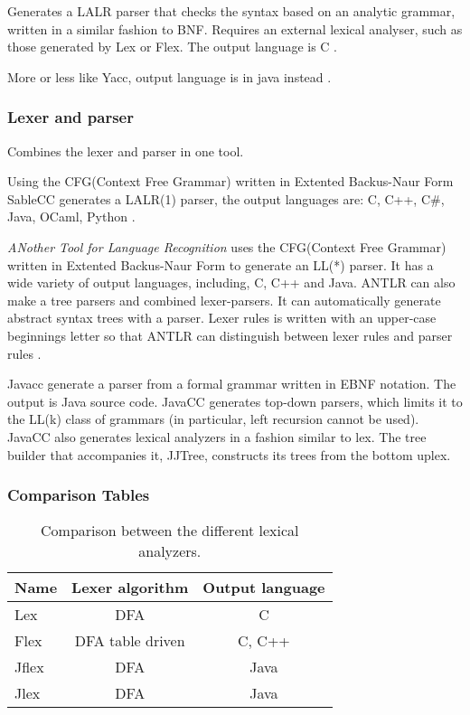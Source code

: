 Generates a LALR parser that checks the syntax based on an analytic grammar, written in a similar fashion to BNF. Requires an external lexical analyser, such as those generated by Lex or Flex. The output language is C \citep{Yacc}.

More or less like Yacc, output language is in java instead \citep{CUP}.

\subsubsection{Lexer and parser}
Combines the lexer and parser in one tool.

Using the CFG(Context Free Grammar) written in Extented Backus-Naur Form SableCC generates a LALR(1) parser, the output languages are: C, C++, C\#, Java, OCaml, Python \citep{SableCC}.

\textit{ANother Tool for Language Recognition} uses the CFG(Context Free Grammar) written in Extented Backus-Naur Form to generate an LL(*) parser. It has a wide variety of output languages, including, C, C++ and Java.
ANTLR can also make a tree parsers and combined lexer-parsers. It can automatically generate abstract syntax trees with a parser\citep{ANTLR}.
Lexer rules is written with an upper-case beginnings letter so that ANTLR can distinguish between lexer rules and parser rules \citep{ANTLRLexer}. 


Javacc generate a parser from a formal grammar written in EBNF notation. The output is Java source code. JavaCC generates top-down parsers, which limits it to the LL(k) class of grammars (in particular, left recursion cannot be used). JavaCC also generates lexical analyzers in a fashion similar to lex\citep{Javacc}. The tree builder that accompanies it, JJTree, constructs its trees from the bottom uplex\citep{JJTree}.

\subsubsection{Comparison Tables}
\begin{table}[H]
\begin{tabular}{|l|c|c|}
\hline
\textbf{Name}	& \textbf{Lexer algorithm}	& \textbf{Output language}	\\ \hline
Lex				& DFA						& C							\\ \hline
Flex			& DFA table driven			& C, C++					\\ \hline
Jflex			& DFA						& Java						\\ \hline
Jlex			& DFA						& Java						\\ \hline
\end{tabular}
\caption{Comparison between the different lexical analyzers.}
\label{tab:ComparisonLexer}
\end{table}

